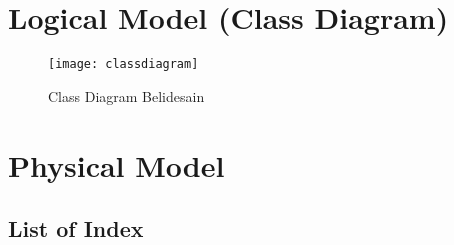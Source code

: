 \section{Logical Model (Class Diagram)}

\begin{figure}[H]
	\centering
	\texttt{[image: classdiagram]}
	\caption{Class Diagram Belidesain}
\end{figure}

\section{Physical Model}
\subsection{List of Index}
